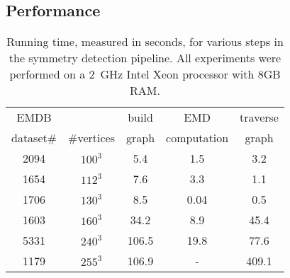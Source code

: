 \documentclass[review,journal]{vgtc}         %
\begin{document}
\subsection{Performance}
\begin{table}[t]
\centering
\caption{Running time, measured in seconds, for various steps in the symmetry detection pipeline.
	All experiments were performed on a 2~GHz Intel Xeon processor with 8GB RAM.}
\label{exp-table}
\begin{tabular}{c||c|c|c|c}
EMDB	&  	 	& build & EMD		& traverse 	\\%
dataset\# & \#vertices 	& graph & computation 	&  graph  	\\%
\hline
2094 	& $100^3$ 	& 5.4 	& 1.5 		&  	3.2       	\\%
1654 	& $112^3$ 	& 7.6 	& 3.3 		&  	1.1       	\\%
1706 	& $130^3$ 	& 8.5 	& 0.04 		& 	0.5		\\%
1603 	& $160^3$ 	& 34.2 	& 8.9 		&  	45.4     	\\%
5331	& $240^3$	& 106.5 & 19.8		&  	77.6		\\
1179 	& $255^3$ 	& 106.9 & - 		&  	409.1    	%
\end{tabular}
\end{table}
\end{document}
